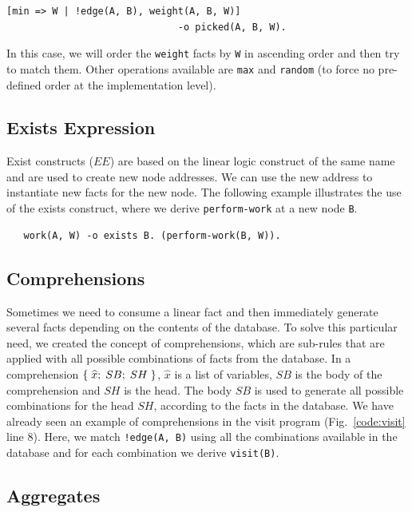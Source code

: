 {\small
\begin{Verbatim}
[min => W | !edge(A, B), weight(A, B, W)]
                              -o picked(A, B, W).
\end{Verbatim}
}

In this case, we will order the \texttt{weight} facts by \texttt{W} in ascending
order and then try to match them. Other operations available are \texttt{max}
and \texttt{random} (to force no pre-defined order at the implementation level).

\subsection{Exists Expression}

Exist constructs ($EE$) are based on the linear logic construct of the same name
and are used to create new node addresses. We can use the new address to
instantiate new facts for the new node.  The following example illustrates the
use of the exists construct, where we derive \texttt{perform-work} at a new node
\texttt{B}.

{\small
\begin{Verbatim}
   work(A, W) -o exists B. (perform-work(B, W)).
\end{Verbatim}
}

\subsection{Comprehensions}

Sometimes we need to consume a linear fact and then immediately generate several
facts depending on the contents of the database. To solve this particular need,
we created the concept of comprehensions, which are sub-rules that are
applied with all possible combinations of facts from the database. In a
comprehension $\{ \; \widehat{x}; \; SB; \; SH \; \}$, $\widehat{x}$ is a
list of variables, $SB$ is the body of the comprehension and $SH$ is the
head.  The body $SB$ is used to generate all possible combinations for the
head $SH$, according to the facts in the database.  We have already seen
an example of comprehensions in the visit program (Fig.~\ref{code:visit}
line 8).  Here, we match \texttt{!edge(A, B)} using all the
combinations available in the database and for each combination we derive
\texttt{visit(B)}.

\subsection{Aggregates}


